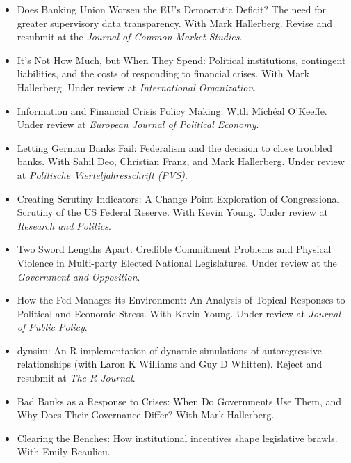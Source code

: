 \documentclass[a4paper]{article}
\begin{document}
{{\begin{itemize}
    \item Does Banking Union Worsen the EU's Democratic Deficit? The need for greater supervisory data transparency. With Mark Hallerberg. Revise and resubmit at the {\emph{Journal of Common Market Studies}}.

    \item It's Not How Much, but When They Spend: Political institutions, contingent liabilities, and the costs of responding to financial crises. With Mark Hallerberg. Under review at \emph{International Organization}.

    \item Information and Financial Crisis Policy Making. With M\'{i}ch\'{e}al O'Keeffe. Under review at {\emph{European Journal of Political Economy}}.

    \item Letting German Banks Fail: Federalism and the decision to close troubled banks. With Sahil Deo, Christian Franz, and Mark Hallerberg. Under review at \emph{Politische Vierteljahresschrift (PVS)}.

    \item Creating Scrutiny Indicators: A Change Point Exploration of Congressional Scrutiny of the US Federal Reserve. With Kevin Young. Under review at \emph{Research and Politics}.

    \item Two Sword Lengths Apart: Credible Commitment Problems and Physical Violence in Multi-party Elected National Legislatures. Under review at the {\emph{Government and Opposition}}.

    \item How the Fed Manages its Environment: An Analysis of Topical Responses to Political and Economic Stress. With Kevin Young. Under review at \emph{Journal of Public Policy}.

    \item dynsim: An R implementation of dynamic simulations of autoregressive relationships (with Laron K Williams and Guy D Whitten). Reject and resubmit at \emph{The R Journal}.

    \item Bad Banks as a Response to Crises: When Do Governments Use Them, and Why Does Their Governance Differ? With Mark Hallerberg.

    \item Clearing the Benches: How institutional incentives shape legislative brawls. With Emily Beaulieu.

\end{itemize}

}}
\end{document}
